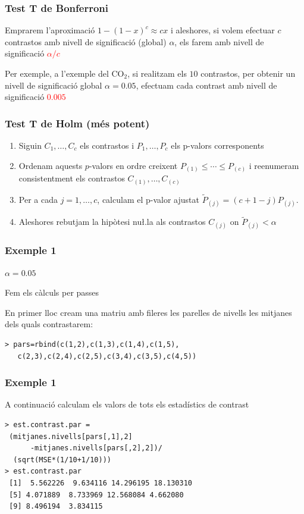 \documentclass[12pt,t]{beamer}
\newcommand{\red}[1]{\textcolor{red}{#1}}
\renewcommand{\emph}[1]{{\color{red}#1}}
\renewcommand{\leq}{\leqslant}
\theoremstyle{plain}
\theoremstyle{definition}
\begin{document}
\begin{frame}
\frametitle{Test T de Bonferroni}
Emprarem l'aproximació $1-(1-x)^c \approx cx$ i aleshores, si volem efectuar $c$ contrastos amb nivell de significació (global) $\alpha$, els farem amb nivell de significació \red{$\alpha/c$}
\bigskip

Per exemple,  a l'exemple del CO${}_2$, si realitzam els  $10$ contrastos, per obtenir un nivell de significació global  $\alpha =0.05$, efectuam cada contrast amb nivell de significació
\red{$0.005$}
\end{frame}



\begin{frame}
\frametitle{Test T de Holm (més potent)}
\vspace*{-2ex}

\begin{enumerate}
\item Siguin $C_{1},\ldots ,C_{c}$ els contrastos i $P_{1},\ldots ,P_{c}$ els p-valors corresponents
\medskip

\item Ordenam aquests $p$-valors en ordre creixent $P_{(1)}\leq \cdots\leq P_{(c)}$ i reenumeram consistentment els contrastos $C_{(1)},\ldots, C_{(c)}$
\medskip

\item Per a cada $j=1,\ldots,c$, calculam el \emph{p-valor ajustat} $\widetilde{P}_{(j)}=(c+1-j)P_{(j)}$.
\medskip

\item Aleshores rebutjam la hipòtesi nu\l.la als contrastos $C_{(j)}$ on $\widetilde{P}_{(j)}<\alpha$
 \end{enumerate}


\end{frame}


\begin{frame}[fragile]
\frametitle{Exemple 1}
$\alpha=0.05$
\medskip


Fem els càlculs per passes
\medskip

En primer lloc cream una matriu amb fileres les parelles de nivells les mitjanes dels quals contrastarem:

 \begin{verbatim}
> pars=rbind(c(1,2),c(1,3),c(1,4),c(1,5),
   c(2,3),c(2,4),c(2,5),c(3,4),c(3,5),c(4,5))
\end{verbatim}

\end{frame}

\begin{frame}[fragile]
\frametitle{Exemple 1}

A continuació calculam els valors  de tots els estadístics de contrast
\begin{verbatim}
> est.contrast.par =
 (mitjanes.nivells[pars[,1],2]
      -mitjanes.nivells[pars[,2],2])/
  (sqrt(MSE*(1/10+1/10)))
> est.contrast.par
 [1]  5.562226  9.634116 14.296195 18.130310  
 [5] 4.071889  8.733969 12.568084 4.662080  
 [9] 8.496194  3.834115
\end{verbatim}

\end{frame}
\end{document}
